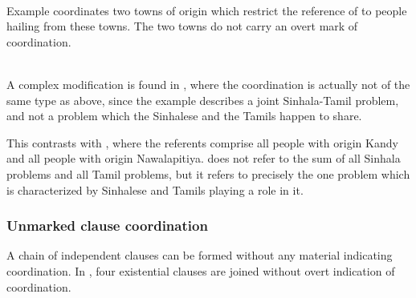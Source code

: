  \\ 

Example  coordinates two towns of origin which restrict the reference of  to people hailing from these towns. The two towns do not carry an overt mark of coordination.

 \\


A complex modification is found in , where the coordination is actually not of the same type as above, since the example describes a joint Sinhala-Tamil problem, and not a problem which the Sinhalese and the Tamils happen to share.


This contrasts with , where the referents comprise all people with origin Kandy and all people with origin Nawalapitiya.  does not refer to the sum of all Sinhala problems and all Tamil problems, but it refers to precisely the one problem which is characterized by Sinhalese and Tamils playing a role in it.


\subsubsection[Clause]{Unmarked clause coordination}\label{sec:constr:Unmarkedclausecoordination}
A chain of independent clauses can be formed without any material indicating coordination. In , four existential clauses are joined without overt indication of coordination.


